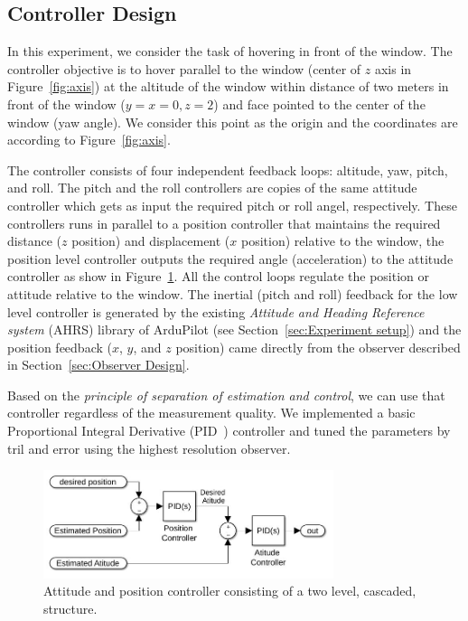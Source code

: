 \documentclass{sig-alternate-ipsn13}
\begin{document}
\subsection{Controller Design}

In this experiment, we consider the task of hovering in front of the window. The controller objective is to hover parallel to the window (center of $z$ axis in Figure~\ref{fig:axis}) at the altitude of the window within distance of two meters in front of the window ($y=x=0 , z=2$) and face pointed to the center of the window (yaw angle).
We consider this point as the origin and the coordinates are according to Figure~\ref{fig:axis}.

The controller consists of four independent feedback loops: altitude, yaw, pitch, and roll.
The pitch and the roll controllers are copies of the same attitude controller which gets as input the required pitch or roll angel, respectively. These controllers runs in parallel to a position controller that maintains the required distance ($z$ position) and displacement ($x$ position) relative to the window, the position level controller outputs the required angle (acceleration) to the attitude controller as show in Figure~\ref{fig:controllerStracture}.
All the control loops regulate the position or attitude relative to the window.
The inertial (pitch and roll) feedback for the low level controller is generated by the existing \textit{Attitude and Heading Reference system} (AHRS) library of ArduPilot (see Section~\ref{sec:Experiment setup}) and the position feedback ($x$, $y$, and $z$ position) came directly from the observer described in Section~\ref{sec:Observer Design}.

Based on the \textit{principle of separation of estimation and control}, we can use that controller regardless of the measurement quality. We implemented a basic Proportional Integral Derivative (PID~\cite{aastrom2006advanced}) controller and tuned the parameters by tril and error using the highest resolution observer.


\begin{figure}[htbp]
    \centerline{\includegraphics[width=85mm]{two_level_controller.jpg}}
    \caption{Attitude and position controller consisting of a two level, cascaded, structure.}
    \label{fig:controllerStracture}
\end{figure}
\end{document}
